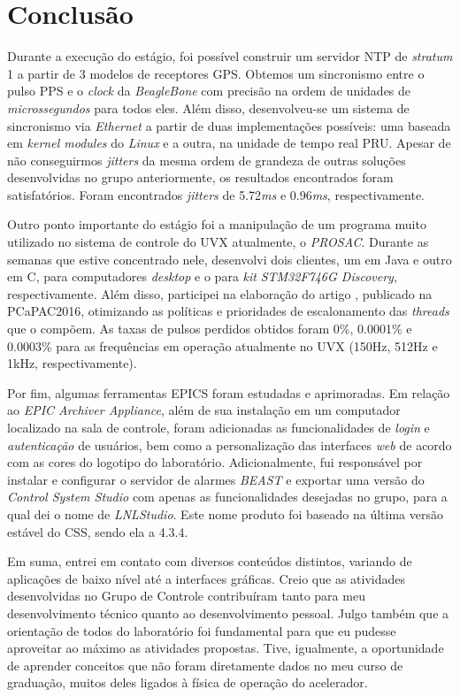 \section{Conclusão}

Durante a execução do estágio, foi possível construir um servidor NTP de
\textit{stratum} 1 a partir de 3 modelos de receptores GPS. Obtemos um
sincronismo entre o pulso PPS e o \textit{clock} da \textit{BeagleBone} com
precisão na ordem de unidades de \textit{microssegundos} para todos eles. Além
disso, desenvolveu-se um sistema de sincronismo via \textit{Ethernet} a partir
de duas implementações possíveis: uma baseada em \textit{kernel modules} do
\textit{Linux} e a outra, na unidade de tempo real PRU. Apesar de não
conseguirmos \textit{jitters} da mesma ordem de grandeza de outras soluções
desenvolvidas no grupo anteriormente, os resultados encontrados foram
satisfatórios. Foram encontrados \textit{jitters} de 5.72\textit{ms} e
0.96\textit{ms}, respectivamente.

\vspace{12pt}

Outro ponto importante do estágio foi a manipulação de um programa muito
utilizado no sistema de controle do UVX atualmente, o \textit{PROSAC}. Durante
as semanas que estive concentrado nele, desenvolvi dois clientes, um em Java e
outro em C, para computadores \textit{desktop} e o para \textit{kit}
\textit{STM32F746G Discovery}, respectivamente. Além disso, participei na
elaboração do artigo \cite{pcapac2016}, publicado na PCaPAC2016, otimizando as
políticas e prioridades de escalonamento das \textit{threads} que o compõem. As
taxas de pulsos perdidos obtidos foram 0\%, 0.0001\% e 0.0003\% para as
frequências em operação atualmente no UVX (150Hz, 512Hz e 1kHz,
respectivamente).

\vspace{12pt}

Por fim, algumas ferramentas EPICS foram estudadas e aprimoradas. Em relação ao
\textit{EPIC Archiver Appliance}, além de sua instalação em um computador
localizado na sala de controle, foram adicionadas as funcionalidades de
\textit{login} e \textit{autenticação} de usuários, bem como a personalização
das interfaces \textit{web} de acordo com as cores do logotipo do laboratório.
Adicionalmente, fui responsável por instalar e configurar o servidor de alarmes
\textit{BEAST} e exportar uma versão do \textit{Control System Studio} com
apenas as funcionalidades desejadas no grupo, para a qual dei o nome de
\textit{LNLStudio}. Este nome produto foi baseado na última versão estável do
CSS, sendo ela a 4.3.4.

\vspace{12pt}

Em suma, entrei em contato com diversos conteúdos distintos, variando
de aplicações de baixo nível até a interfaces gráficas. Creio que as atividades
desenvolvidas no Grupo de Controle  contribuíram tanto para meu desenvolvimento
técnico quanto ao desenvolvimento pessoal. Julgo também que a orientação de
todos do laboratório foi fundamental para que eu pudesse aproveitar ao máximo as
atividades propostas. Tive, igualmente, a oportunidade de aprender conceitos que
não foram diretamente dados no meu curso de graduação, muitos deles ligados à
física de operação do acelerador.
 
